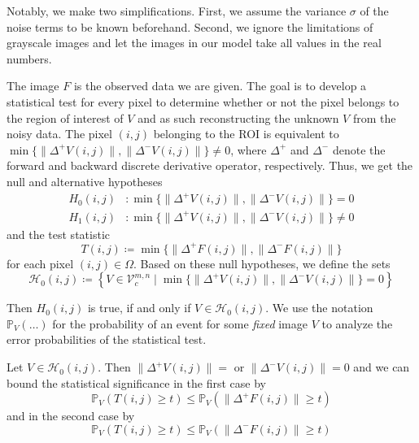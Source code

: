 \documentclass[a4paper,12pt]{article}
\newcommand{\norm}[1]{\lVert#1\rVert}
\theoremstyle{plain}
\theoremstyle{definition}
\begin{document}
Notably, we make two simplifications. First, we assume the variance $\sigma$ of the noise terms to be known beforehand. Second, we ignore the limitations of grayscale images and let the images in our model take all values in the real numbers.

The image $F$ is the observed data we are given. The goal is to develop a statistical test for every pixel to determine whether or not the pixel belongs to the region of interest of $V$ and as such reconstructing the unknown $V$ from the noisy data. The pixel $(i, j)$ belonging to the ROI is equivalent to $\min \{ \norm{\Delta^+ V(i, j)}, \norm{\Delta^- V(i, j)} \} \neq 0$, where $\Delta^+$ and $\Delta^-$ denote the forward and backward discrete derivative operator, respectively. Thus, we get the null and alternative hypotheses
\begin{align*}
	H_0(i, j)&: \min \{ \norm{\Delta^+ V(i, j)}, \norm{\Delta^- V(i, j)} \} = 0 \\
	H_1(i, j)&: \min \{ \norm{\Delta^+ V(i, j)}, \norm{\Delta^- V(i, j)} \} \neq 0
\end{align*}
and the test statistic
\begin{equation*}
	T(i, j) \coloneqq \min \{ \norm{\Delta^+ F(i, j)}, \norm{\Delta^- F(i, j)} \}
\end{equation*}
for each pixel $(i, j) \in \Omega$. Based on these null hypotheses, we define the sets
\begin{equation*}
	\mathcal{H}_0(i, j) \coloneqq \left\{ V \in \mathcal{V}_c^{m, n} \mid \min \{ \norm{\Delta^+ V(i, j)}, \norm{\Delta^- V(i, j)} \} = 0 \right\}
\end{equation*}

Then $H_0(i, j)$ is true, if and only if $V \in \mathcal{H}_0(i, j)$. We use the notation $\mathbb{P}_V( \ldots )$ for the probability of an event for some \emph{fixed} image $V$ to analyze the error probabilities of the statistical test.

Let $V \in \mathcal{H}_0(i, j)$. Then $\norm{\Delta^+ V(i, j)} = $ or $\norm{\Delta^- V(i, j)} = 0$ and we can bound the statistical significance in the first case by
\begin{equation*}
	\mathbb{P}_V( T(i, j) \geq t ) \leq \mathbb{P}_V( \norm{\Delta^+ F(i, j)} \geq t )
\end{equation*}
and in the second case by
\begin{equation*}
	\mathbb{P}_V( T(i, j) \geq t ) \leq \mathbb{P}_V( \norm{\Delta^- F(i, j)} \geq t )
\end{equation*}
\end{document}
